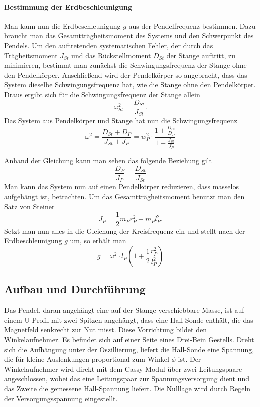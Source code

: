 \documentclass[a4paper, 11pt]{article}
\begin{document}
\paragraph{Bestimmung der Erdbeschleunigung}
Man kann nun die Erdbeschleunigung $g$ aus der Pendelfrequenz bestimmen. Dazu braucht man das Gesamtträgheitsmoment des Systems und den Schwerpunkt des Pendels. Um den auftretenden systematischen Fehler, der durch das Trägheitsmoment $J_{St}$ und das Rückstellmoment $D_{St}$ der Stange auftritt, zu minimieren, bestimmt man zunächst die Schwingungsfrequenz der Stange ohne den Pendelkörper. Anschließend wird der Pendelkörper so angebracht, dass das System dieselbe Schwingungsfrequenz hat, wie die Stange ohne den Pendelkörper. Draus ergibt sich für die Schwingungsfrequenz der Stange allein 
\begin{equation}
\omega_{St}^2 = \frac{D_{St}}{J_{St}}.
\end{equation}
Das System aus Pendelkörper und Stange hat nun die Schwingungsfrequenz 
\begin{equation}
\omega^2 = \frac{D_{St} + D_P}{J_{St} + J_P} = w_P^2 \cdot \frac{1 + \frac{D_{St}}{D_P}}{1 + \frac{J_{St}}{J_P}}
\end{equation}

Anhand der Gleichung kann man sehen das folgende Beziehung gilt
\begin{equation}
\frac{D_P}{J_P} = \frac{D_{St}}{J_{St}}
\end{equation}
Man kann das System nun auf einen Pendelkörper reduzieren, dass masselos aufgehängt ist,  betrachten. Um das Gesamtträgheitsmoment benutzt man den Satz von Steiner
\begin{equation}
J_P = \frac{1}{2}m_Pr_P^2 + m_Pl_P^2.
\end{equation}
Setzt man nun alles in die Gleichung der Kreisfrequenz ein und stellt nach der Erdbeschleunigung $g$ um, so erhält man
\begin{equation}
g = \omega^2 \cdot l_P\left(1 + \frac{1}{2} \frac{r_P^2}{l_P^2} \right)
\end{equation}


\subsection{Aufbau und Durchführung}
Das Pendel, daran angehängt eine auf der Stange verschiebbare Masse, ist auf einem U-Profil mit zwei Spitzen angehängt, dass eine Hall-Sonde enthält, die das Magnetfeld senkrecht zur Nut misst. Diese Vorrichtung bildet den Winkelaufnehmer. Es befindet sich auf einer Seite eines Drei-Bein Gestells. Dreht sich die Aufhängung unter der Oszillierung, liefert die Hall-Sonde eine Spannung, die für kleine Auslenkungen proportional zum Winkel $\phi$ ist.
Der Winkelaufnehmer wird direkt mit dem Cassy-Modul über zwei Leitungspaare angeschlossen, wobei das eine Leitungspaar zur Spannungsversorgung dient und das Zweite die gemessene Hall-Spannung liefert. Die Nulllage wird durch Regeln der Versorgungsspannung eingestellt.  
\end{document}
